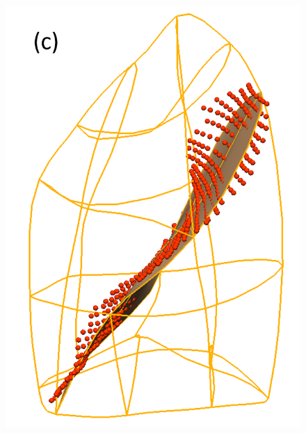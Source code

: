 \documentclass[]{spie}  %
\begin{document}
{\begin{figure}[htbp]
\begin{subfigure}
{\begin{minipage}[t]{0.18\linewidth}
  \includegraphics[width=\linewidth,trim={{.0\wd0} {.0\wd0} {.0\wd0} {.0\wd0}},clip]{Image/ProjectedLeftFissureMesh.png}
  \centerline{}
  \label{fig:InitialFissurePrediction-c}
	\end{minipage}
	}
\end{subfigure}
\begin{subfigure}{
  \begin{minipage}[t]{0.2\linewidth}

\end{minipage}}
\end{subfigure}
\end{figure}}
\end{document}
